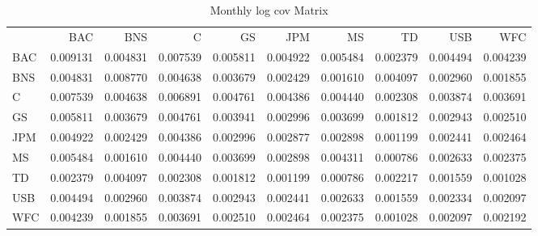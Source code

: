 \documentclass{article}
\begin{document}
\begin{table}
\caption{Monthly log cov Matrix}
\label{tab:monthly_log_cov}
\begin{tabular}{lrrrrrrrrr}
 & BAC & BNS & C & GS & JPM & MS & TD & USB & WFC \\
BAC & 0.009131 & 0.004831 & 0.007539 & 0.005811 & 0.004922 & 0.005484 & 0.002379 & 0.004494 & 0.004239 \\
BNS & 0.004831 & 0.008770 & 0.004638 & 0.003679 & 0.002429 & 0.001610 & 0.004097 & 0.002960 & 0.001855 \\
C & 0.007539 & 0.004638 & 0.006891 & 0.004761 & 0.004386 & 0.004440 & 0.002308 & 0.003874 & 0.003691 \\
GS & 0.005811 & 0.003679 & 0.004761 & 0.003941 & 0.002996 & 0.003699 & 0.001812 & 0.002943 & 0.002510 \\
JPM & 0.004922 & 0.002429 & 0.004386 & 0.002996 & 0.002877 & 0.002898 & 0.001199 & 0.002441 & 0.002464 \\
MS & 0.005484 & 0.001610 & 0.004440 & 0.003699 & 0.002898 & 0.004311 & 0.000786 & 0.002633 & 0.002375 \\
TD & 0.002379 & 0.004097 & 0.002308 & 0.001812 & 0.001199 & 0.000786 & 0.002217 & 0.001559 & 0.001028 \\
USB & 0.004494 & 0.002960 & 0.003874 & 0.002943 & 0.002441 & 0.002633 & 0.001559 & 0.002334 & 0.002097 \\
WFC & 0.004239 & 0.001855 & 0.003691 & 0.002510 & 0.002464 & 0.002375 & 0.001028 & 0.002097 & 0.002192 \\
\end{tabular}
\end{table}
\end{document}
